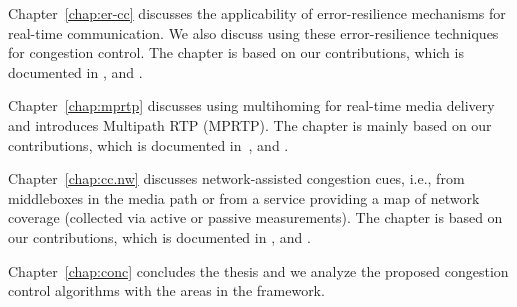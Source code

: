 Chapter~\ref{chap:er-cc} discusses the applicability of error-resilience
mechanisms for real-time communication. We also discuss using these
error-resilience techniques for congestion control. The chapter is based on
our contributions, which is documented in , and
.


Chapter~\ref{chap:mprtp} discusses using multihoming for real-time media
delivery and introduces Multipath RTP (MPRTP). The chapter is mainly based on
our contributions, which is documented in~\cite{draft.mprtp, draft.mprtp.sdp,
Globisch:AsymGrpComm, draft.rtcp.overlay}, and .



Chapter~\ref{chap:cc.nw} discusses network-assisted congestion cues, i.e.,
from middleboxes in the media path or from a service providing a map of
network coverage (collected via active or passive measurements). The chapter
is based on our contributions, which is documented in ,
 and \cite{glass:patent}.


Chapter~\ref{chap:conc} concludes the thesis and we analyze the proposed
congestion control algorithms with the areas in the framework.
